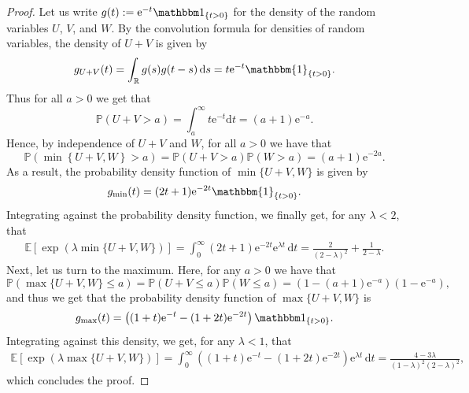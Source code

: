 \documentclass[11pt]{article}
\numberwithin{equation}{section}
\DeclareMathOperator{\R}{\mathbb{R}} %
\newcommand{\p}{\mathbb{P}} %
\newcommand{\E}{\mathbb{E}} %
\newcommand{\indicator}{\mathbbm 1}
\newcommand{\e}{\mathrm e}
\newcommand{\dd}{\mathrm d}
\theoremstyle{definition}
\begin{document}
\begin{proof}
Let us write $g(t):=\e^{-t}\mathbbm 1_{\{t>0\}}$ for the density of the random variables $U$, $V$, and $W$. By the convolution formula for densities of random variables, the density of $U+V$ is given by
\begin{equation*}
    g_{U+V}(t) = \int_{\R} g(s) g(t-s)\,\dd s = t \e^{-t} \mathbbm{1}_{\{t>0\}}.
\end{equation*}
Thus for all $a>0$ we get that 
\begin{equation*}
    \p \left( U+V > a \right) = \int_{a}^\infty t \e^{-t} \dd t = (a+1)\e^{-a}.
\end{equation*}
Hence, by independence of $U+V$ and $W$, for all $a>0$ we have that 
\begin{equation*}
    \p\left( \min\left\{U+V,W \right\} > a \right) = \p \left( U+V > a \right) \p \left( W > a \right)  = (a+1) \e^{-2a}.
\end{equation*}
As a result, the probability density function of $\min\{U+V,W\}$ is given by
\begin{equation*}
    g_{\min}(t) =
    (2t+1)\e^{-2t}
    \mathbbm{1}_{\{t>0\}} .
\end{equation*}
Integrating against the probability density function, we finally get, for any $\lambda < 2$, that 
\begin{align*}
    \E \left[ \exp\left( \lambda \min\{U+V,W\} \right) \right]= \int_0^\infty  (2t+1)\e^{-2t} \e^{\lambda t}\, \dd t=\frac{2}{(2-\lambda)^2}+ \frac{1}{2-\lambda}.
\end{align*}
Next, let us turn to the maximum. Here, for any $a>0$ we have that 
\begin{equation*}
    \p \left( \max\{U+V,W\} \leq a \right) =
    \p \left( U+V\leq a \right)
    \p \left( W \leq a \right)
    =
    \left( 1-(a+1)\e^{-a} \right) \left( 1-\e^{-a} \right),
\end{equation*}
and thus we get that the probability density function of $\max\{U+V,W\}$ is 
\begin{equation*}
    g_{\max}(t) =  \left((1+t)\e^{-t}-(1+2t)\e^{-2t} \right)\indicator_{\{t>0\}}.
\end{equation*}
Integrating against this density, we get, for any $\lambda <1$, that 
\begin{align*}
    \E \left[ \exp\left( \lambda \max\{U+V,W\} \right) \right]
    = 
    \int_0^\infty  \left((1+t)\e^{-t}-(1+2t)\e^{-2t} \right) \e^{\lambda t} \,\dd t= \frac{4-3\lambda}{(1-\lambda)^2(2-\lambda)^2},
\end{align*}
which concludes the proof.
\end{proof}
\end{document}
